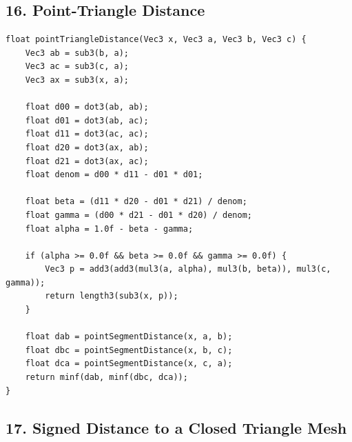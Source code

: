 \documentclass[10pt,letterpaper]{article}
\begin{document}
\subsection*{16. Point-Triangle Distance}

\begin{verbatim}
float pointTriangleDistance(Vec3 x, Vec3 a, Vec3 b, Vec3 c) {
    Vec3 ab = sub3(b, a);
    Vec3 ac = sub3(c, a);
    Vec3 ax = sub3(x, a);

    float d00 = dot3(ab, ab);
    float d01 = dot3(ab, ac);
    float d11 = dot3(ac, ac);
    float d20 = dot3(ax, ab);
    float d21 = dot3(ax, ac);
    float denom = d00 * d11 - d01 * d01;

    float beta = (d11 * d20 - d01 * d21) / denom;
    float gamma = (d00 * d21 - d01 * d20) / denom;
    float alpha = 1.0f - beta - gamma;

    if (alpha >= 0.0f && beta >= 0.0f && gamma >= 0.0f) {
        Vec3 p = add3(add3(mul3(a, alpha), mul3(b, beta)), mul3(c, gamma));
        return length3(sub3(x, p));
    }

    float dab = pointSegmentDistance(x, a, b);
    float dbc = pointSegmentDistance(x, b, c);
    float dca = pointSegmentDistance(x, c, a);
    return minf(dab, minf(dbc, dca));
}
\end{verbatim}

\subsection*{17. Signed Distance to a Closed Triangle Mesh}
\end{document}
